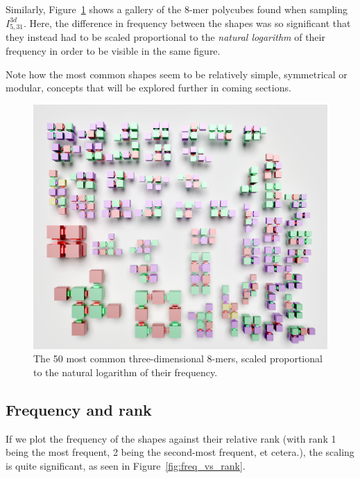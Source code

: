 Similarly, Figure~\ref{fig:8-mer_3d_zoo} shows a gallery of the 8-mer polycubes found when sampling \(I_{5,31}^{3d}\). Here, the difference in frequency between the shapes was so significant that they instead had to be scaled proportional to the \emph{natural logarithm} of their frequency in order to be visible in the same figure. 

Note how the most common shapes seem to be relatively simple, symmetrical or modular, concepts that will be explored further in coming sections.

\begin{figure}[h]
    \centering
    \includegraphics[width=\textwidth]{figures/8-mers_3d.jpg}
    \caption{The 50 most common three-dimensional 8-mers, scaled proportional to the natural logarithm of their frequency.}
    \label{fig:8-mer_3d_zoo}
\end{figure}

\subsection{Frequency and rank}
If we plot the frequency of the shapes against their relative rank (with rank 1 being the most frequent, 2 being the second-most frequent, et cetera.), the scaling is quite significant, as seen in Figure~\ref{fig:freq_vs_rank}.

